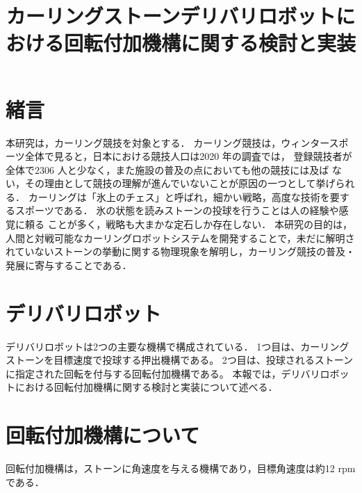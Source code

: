 \documentclass{classes/sice-si}
\title{カーリングストーンデリバリロボットにおける回転付加機構に関する検討と実装} %
\begin{document}


\maketitle

\section{緒言}
本研究は，カーリング競技を対象とする．
カーリング競技は，ウィンタースポーツ全体で見ると，日本における競技人口は2020 年の調査では，
登録競技者が全体で2306 人と少なく\cite{key}，また施設の普及の点においても他の競技には及ば
ない，その理由として競技の理解が進んでいないことが原因の一つとして挙げられる．
カーリングは「氷上のチェス」と呼ばれ，細かい戦略，高度な技術を要するスポーツである．
氷の状態を読みストーンの投球を行うことは人の経験や感覚に頼る
ことが多く，戦略も大まかな定石しか存在しない．
本研究の目的は，人間と対戦可能なカーリングロボットシステムを開発することで，未だに解明されていないストーンの挙動に関する物理現象を解明し，カーリング競技の普及・発展に寄与することである．

\section{デリバリロボット}
デリバリロボットは2つの主要な機構で構成されている．
1つ目は、カーリングストーンを目標速度で投球する押出機構である。
2つ目は、投球されるストーンに指定された回転を付与する回転付加機構である。
本報では，デリバリロボットにおける回転付加機構に関する検討と実装について述べる．
\section{回転付加機構について}
回転付加機構は，ストーンに角速度を与える機構であり，目標角速度は約12 rpmである．
\end{document}
